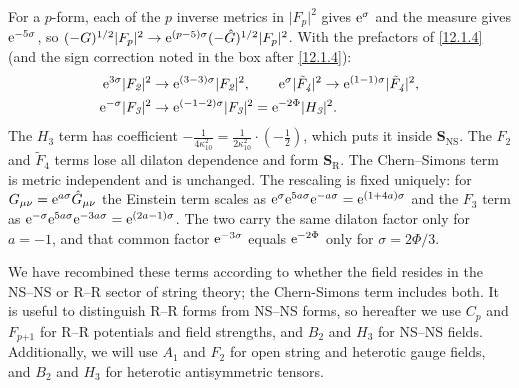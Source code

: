 \begin{tcolorbox}[breakable]
\begin{remark}
		For a $p$-form, each of the $p$ inverse metrics in $\lvert F_{p}\rvert^{2}$ gives $\mathrm{e}^{\sigma}$ and the measure gives $\mathrm{e}^{-5\sigma}$, so $(-G)^{1/2}\lvert F_{p}\rvert^{2}\to\mathrm{e}^{(p-5)\sigma}(-\hat G)^{1/2}\lvert F_{p}\rvert^{2}$. With the prefactors of \eqref{12.1.4} (and the sign correction noted in the box after \eqref{12.1.4}):
		\begin{align*}
			\mathrm{e}^{3\sigma}\lvert F_{\textit{2}}\rvert^{2}&\to\mathrm{e}^{(3-3)\sigma}\lvert F_{\textit{2}}\rvert^{2},\qquad
			\mathrm{e}^{\sigma}\lvert \tilde F_{\textit{4}}\rvert^{2}\to\mathrm{e}^{(1-1)\sigma}\lvert \tilde F_{\textit{4}}\rvert^{2},\\
			\mathrm{e}^{-\sigma}\lvert F_{\textit{3}}\rvert^{2}&\to\mathrm{e}^{(-1-2)\sigma}\lvert F_{\textit{3}}\rvert^{2}=\mathrm{e}^{-2\Phi}\lvert H_{\textit{3}}\rvert^{2}.
		\end{align*}
		The $H_{\textit{3}}$ term has coefficient $-\frac{1}{4\kappa_{10}^{2}}=\frac{1}{2\kappa_{10}^{2}}\cdot(-\frac12)$, which puts it inside $\bm{S}_{\text{NS}}$. The $F_{\textit{2}}$ and $\tilde F_{\textit{4}}$ terms lose all dilaton dependence and form $\bm{S}_{\text{R}}$. The Chern--Simons term is metric independent and is unchanged. The rescaling is fixed uniquely: for $G_{\mu\nu}=\mathrm{e}^{a\sigma}\hat G_{\mu\nu}$ the Einstein term scales as $\mathrm{e}^{\sigma}\mathrm{e}^{5a\sigma}\mathrm{e}^{-a\sigma}=\mathrm{e}^{(1+4a)\sigma}$ and the $F_{\textit{3}}$ term as $\mathrm{e}^{-\sigma}\mathrm{e}^{5a\sigma}\mathrm{e}^{-3a\sigma}=\mathrm{e}^{(2a-1)\sigma}$. The two carry the same dilaton factor only for $a=-1$, and that common factor $\mathrm{e}^{-3\sigma}$ equals $\mathrm{e}^{-2\Phi}$ only for $\sigma=2\Phi/3$.
	\end{remark}
\end{tcolorbox}

We have recombined these terms according to whether the field resides in the NS--NS or R--R sector of string theory; the Chern-Simons term includes both. It is useful to distinguish R--R forms from NS--NS forms, so hereafter we use $C_{\textit{p}}$ and $F_{\textit{p+1}}$ for R--R potentials and field strengths, and $B_{\textit{2}}$ and $H_{\textit{3}}$ for NS--NS fields. Additionally, we will use $A_{\textit{1}}$ and $F_{\textit{2}}$ for open string and heterotic gauge fields, and $B_{\textit{2}}$ and $H_{\textit{3}}$ for heterotic antisymmetric tensors.

